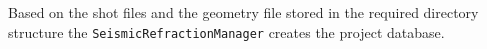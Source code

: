 \documentclass[a4paper,fleqn]{cas-sc}
\begin{document}

Based on the shot files and the geometry file stored in the required directory structure the \texttt{SeismicRefractionManager} creates the project database.


\end{document}
